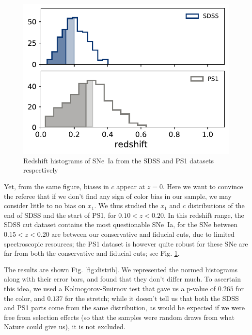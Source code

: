 \documentclass[11pt,a4paper]{paper}
\begin{document}
\begin{figure}
    \vspace*{-20pt}
    \centering
    \includegraphics[width=\linewidth]{Answer_figures/hist_surveys2_btw_cividis.pdf}
    \captionsetup{justification=centering}
    \caption{\small Redshift histograms of SNe~Ia from the SDSS and PS1 datasets
    respectively}
    \label{fig:hists}
\end{figure}
Yet, from the same figure, biases in $c$ appear at $z=0$. Here we want to
convince the referee that if we don't find any sign of color bias in our sample,
we may consider little to no bias on $x_1$. We thus studied the $x_1$ and $c$
distributions of the end of SDSS and the start of PS1, for $0.10 < z < 0.20$. In
this redshift range, the SDSS cut dataset contains the most questionable SNe~Ia,
for the SNe between $0.15 < z < 0.20$ are between our conservative and fiducial
cuts, due to limited spectroscopic resources; the PS1 dataset is however quite
robust for these SNe are far from both the conservative and fiducial cuts; see
Fig. \ref{fig:hists}. \bigbreak

The results are shown Fig. \ref{fig:distrib}. We represented the normed
histograms along with their error bars, and found that they don't differ much.
To ascertain this idea, we used a Kolmogorov-Smirnov test that gave us a p-value
of $0.265$ for the color, and $0.137$ for the stretch; while it doesn't tell us
that both the SDSS and PS1 parts come from the same distribution, as would be
expected if we were free from selection effects (so that the samples were random
draws from what Nature could give us), it is not excluded.
\end{document}
